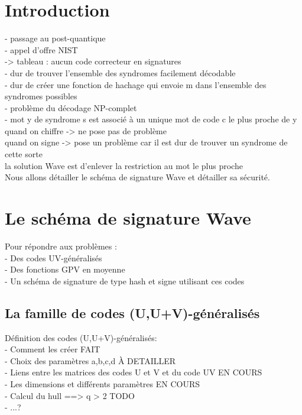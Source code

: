 \documentclass[12pt]{article}
\theoremstyle{definition}
\begin{document}
\section*{Introduction}

- passage au post-quantique \\
- appel d'offre NIST \\
	-> tableau : aucun code correcteur en signatures \\
- dur de trouver l'ensemble des syndromes facilement décodable \\
- dur de créer une fonction de hachage qui envoie m dans l'ensemble des syndromes possibles \\
- problème du décodage NP-complet \\
- mot y de syndrome s est associé à un unique mot de code c le plus proche de y \\
quand on chiffre -> ne pose pas de problème \\
quand on signe -> pose un problème car il est dur de trouver un syndrome de cette sorte \\
la solution Wave est d'enlever la restriction au mot le plus proche \\
Nous allons détailler le schéma de signature Wave et détailler sa sécurité. \\

\section{Le schéma de signature Wave}
Pour répondre aux problèmes : \\

- Des codes UV-généralisés \\
- Des fonctions GPV en moyenne \\
- Un schéma de signature de type hash et signe utilisant ces codes \\

\subsection{La famille de codes (U,U+V)-généralisés}
Définition des codes (U,U+V)-généralisés: \\
- Comment les créer  FAIT \\
- Choix des paramètres a,b,c,d \`A DETAILLER \\
- Liens entre les matrices des codes U et V et du code UV EN COURS \\
- Les dimensions et différents paramètres  EN COURS \\
- Calcul du hull ==> q > 2 TODO \\
- ...? \\
\end{document}
